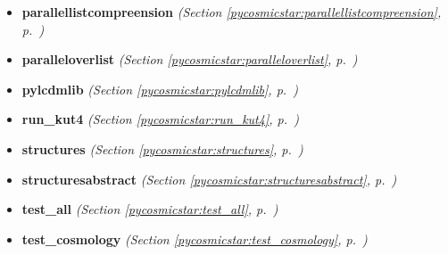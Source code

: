 \begin{itemize}
\item \textbf{parallellistcompreension}
  \textit{(Section \ref{pycosmicstar:parallellistcompreension}, p.~\pageref{pycosmicstar:parallellistcompreension})}

\item \textbf{paralleloverlist}
  \textit{(Section \ref{pycosmicstar:paralleloverlist}, p.~\pageref{pycosmicstar:paralleloverlist})}

\item \textbf{pylcdmlib}
  \textit{(Section \ref{pycosmicstar:pylcdmlib}, p.~\pageref{pycosmicstar:pylcdmlib})}

\item \textbf{run\_kut4}
  \textit{(Section \ref{pycosmicstar:run_kut4}, p.~\pageref{pycosmicstar:run_kut4})}

\item \textbf{structures}
  \textit{(Section \ref{pycosmicstar:structures}, p.~\pageref{pycosmicstar:structures})}

\item \textbf{structuresabstract}
  \textit{(Section \ref{pycosmicstar:structuresabstract}, p.~\pageref{pycosmicstar:structuresabstract})}

\item \textbf{test\_all}
  \textit{(Section \ref{pycosmicstar:test_all}, p.~\pageref{pycosmicstar:test_all})}

\item \textbf{test\_cosmology}
  \textit{(Section \ref{pycosmicstar:test_cosmology}, p.~\pageref{pycosmicstar:test_cosmology})}

\end{itemize}

